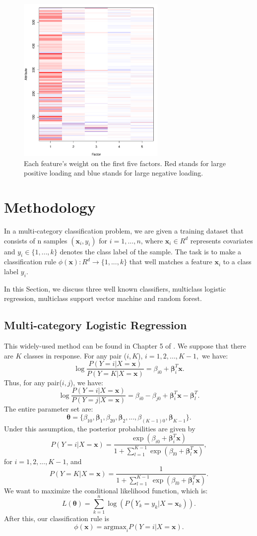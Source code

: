 \documentclass[conference]{IEEEtran}
\begin{document}
\begin{figure}[!ht]
\centering
\includegraphics[width=2.8in]{figure5.pdf}
\caption{Each feature's weight on the first five factors. Red stands for large positive loading and blue stands for large negative loading.
}
\label{fig_sim}
\end{figure}

\section{Methodology}
In a multi-category classification problem, we are given a training dataset that consists of n samples $(\bm x_{i},y_{i})$ for $i=1,...,n$, where $\bm x_{i} \in R^{d}$ represents covariates and $y_{i} \in \{1,...,k\}$ denotes the class label of the sample. The task is to make a classification rule $\phi(\bm x): R^{d} \rightarrow \{1,...,k\}$ that well matches a feature $\bm x_{i}$ to a class label $y_{i}$.

In this Section, we discuss three well known classifiers, multiclass logistic regression, multiclass support vector machine and random forest.

\subsection{Multi-category Logistic Regression}
This widely-used method can be found in Chapter 5 of \citep{faraway2005extending}. 
We suppose that there are $K$ classes in response. For any pair ($i,K$), $i=1,2,...,K-1,$ we have:
$$\log\frac{P(Y=i|X=\bm x)}{P(Y=K|X=\bm x)}=\beta_{i0}+\bm\beta^{T}_{i}\bm x.$$
Thus, for any pair($i,j$), we have:
$$\log\frac{P(Y=i|X=\bm x)}{P(Y=j|X=\bm x)}=\beta_{i0}-\beta_{j0}+\bm\beta^{T}_{i}\bm x-\bm\beta^{T}_{l}.$$
The entire parameter set are:
$$\bm\theta=\{\beta_{10},\bm\beta_{1},\beta_{20},\bm\beta_{2},...,\beta_{(K-1)0},\bm\beta_{K-1}\}.$$
Under this assumption, the posterior probabilities are given by
$$P(Y=i|X=\bm x)=\frac{\exp(\beta_{i0}+\bm\beta^{T}_{i}\bm x)}{1+\sum^{K-1}_{l=1}\exp(\beta_{l0}+\bm\beta^{T}_{l}\bm x)},$$
for $i=1,2,...,K-1$, and
$$P(Y=K|X=\bm x)=\frac{1}{1+\sum^{K-1}_{l=1}\exp(\beta_{l0}+\bm\beta^{T}_{l}\bm x)}.$$
We want to maximize the conditional likelihood function, which is:
$$L(\bm\theta)=\sum^{n}_{k=1}\log(P(Y_k=y_k|X=\bm x_{k})).$$
After this, our classification rule is 
$$\phi(\bm x)=\text{argmax}_{i}{P(Y=i|X=\bm x)}.$$
\end{document}
